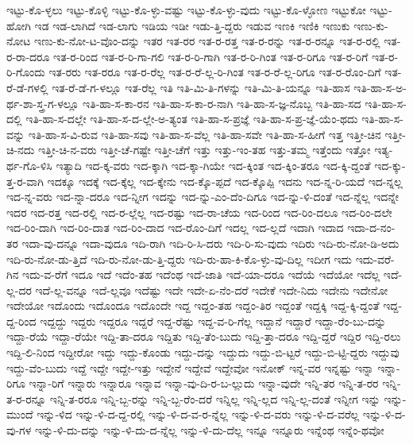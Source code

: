 {ಇಟ್ಟು-ಕೊ-ಳ್ಳಲು
ಇಟ್ಟು-ಕೊಳ್ಳಿ
ಇಟ್ಟು-ಕೊ-ಳ್ಳು-ವಷ್ಟು
ಇಟ್ಟು-ಕೊ-ಳ್ಳು-ವುದು
ಇಟ್ಟು-ಕೊ-ಳ್ಳೋಣ
ಇಟ್ಟುಕೋ
ಇಟ್ಟು-ಹೋಗಿ
ಇಡ
ಇಡ-ಲಾಗಿದೆ
ಇಡ-ಲಾಗು
ಇಡಿಯ
ಇಡೀ
ಇಡು-ತ್ತಿ-ದ್ದರು
ಇಡುವ
ಇಣಕಿ
ಇಣಿಕಿ
ಇಣುಕು
ಇಣು-ಕು-ನೋಟ
ಇಣು-ಕು-ನೋ-ಟ-ವೊಂ-ದನ್ನು
ಇತರ
ಇತ-ರರ
ಇತ-ರ-ರತ್ತ
ಇತ-ರ-ರನ್ನು
ಇತ-ರ-ರನ್ನೂ
ಇತ-ರ-ರಲ್ಲಿ
ಇತ-ರ-ರಾ-ದರೂ
ಇತ-ರ-ರಿಂದ
ಇತ-ರ-ರಿ-ಗಾ-ಗಲಿ
ಇತ-ರ-ರಿ-ಗಾಗಿ
ಇತ-ರ-ರಿ-ಗಿಂತ
ಇತ-ರ-ರಿಗೂ
ಇತ-ರ-ರಿಗೆ
ಇತ-ರ-ರಿ-ಗೊಂದು
ಇತ-ರರು
ಇತ-ರರೂ
ಇತ-ರ-ರೆಲ್ಲ
ಇತ-ರ-ರೆ-ಲ್ಲ-ರಿ-ಗಿಂತ
ಇತ-ರ-ರೆ-ಲ್ಲ-ರಿಗೂ
ಇತ-ರ-ರೊಂ-ದಿಗೆ
ಇತ-ರೆ-ಡೆ-ಗಳಲ್ಲಿ
ಇತ-ರೆ-ಡೆ-ಗ-ಳಲ್ಲೂ
ಇತ-ರೆಲ್ಲ
ಇತಿ
ಇತಿ-ಮಿ-ತಿ-ಗಳನ್ನು
ಇತಿ-ಮಿ-ತಿ-ಯನ್ನೂ
ಇತಿ-ಹಾಸ
ಇತಿ-ಹಾ-ಸ-ಅ-ರ್ಥ-ಶಾ-ಸ್ತ್ರ-ಗ-ಳಲ್ಲೂ
ಇತಿ-ಹಾ-ಸ-ಕಾ-ರನ
ಇತಿ-ಹಾ-ಸ-ಕಾ-ರ-ನಾಗಿ
ಇತಿ-ಹಾ-ಸ-ಜ್ಞ-ನೊಬ್ಬ
ಇತಿ-ಹಾ-ಸದ
ಇತಿ-ಹಾ-ಸ-ದಲ್ಲಿ
ಇತಿ-ಹಾ-ಸ-ದಲ್ಲೇ
ಇತಿ-ಹಾ-ಸ-ದ-ಲ್ಲೇ-ಅ-ತ್ಯಂತ
ಇತಿ-ಹಾ-ಸ-ಪ್ರಜ್ಞೆ
ಇತಿ-ಹಾ-ಸ-ಪ್ರ-ಜ್ಞೆ-ಯೆಂ-ಥದು
ಇತಿ-ಹಾ-ಸ-ವನ್ನು
ಇತಿ-ಹಾ-ಸ-ವಿ-ರುವ
ಇತಿ-ಹಾ-ಸವು
ಇತಿ-ಹಾ-ಸ-ವೆಲ್ಲ
ಇತಿ-ಹಾ-ಸವೇ
ಇತಿ-ಹಾ-ಸ-ಹೀಗೆ
ಇತ್ತ
ಇತ್ತೀ-ಚಿನ
ಇತ್ತೀ-ಚಿ-ನದು
ಇತ್ತೀ-ಚಿ-ನ-ವರು
ಇತ್ತೀ-ಚೆ-ಗಷ್ಟೇ
ಇತ್ತೀ-ಚೆಗೆ
ಇತ್ತು
ಇತ್ತು-ಇಂ-ತಹ
ಇತ್ತು-ತಮ್ಮ
ಇತ್ತೆಂದು
ಇತ್ತೋ
ಇತ್ಯ-ರ್ಥ-ಗೊ-ಳಿಸಿ
ಇತ್ಯಾದಿ
ಇದ-ಕ್ಕ-ವರು
ಇದ-ಕ್ಕಾಗಿ
ಇದ-ಕ್ಕಾ-ಗಿಯೇ
ಇದ-ಕ್ಕಿಂತ
ಇದ-ಕ್ಕಿಂ-ತರೂ
ಇದ-ಕ್ಕಿ-ದ್ದಂತೆ
ಇದ-ಕ್ಕು-ತ್ತ-ರ-ವಾಗಿ
ಇದಕ್ಕೂ
ಇದಕ್ಕೆ
ಇದ-ಕ್ಕೆಲ್ಲ
ಇದ-ಕ್ಕೇನು
ಇದ-ಕ್ಕೊ-ಪ್ಪದೆ
ಇದ-ಕ್ಕೊಪ್ಪಿ
ಇದನು
ಇದ-ನ್ನ-ರಿ-ಯದೆ
ಇದ-ನ್ನಲ್ಲ
ಇದ-ನ್ನ-ವರು
ಇದ-ನ್ನಾ-ದರೂ
ಇದ-ನ್ನೀಗ
ಇದನ್ನು
ಇದ-ನ್ನು-ಎಂ-ದೆಂ-ದಿಗೂ
ಇದ-ನ್ನು-ಳಿ-ದಂತೆ
ಇದ-ನ್ನೆಲ್ಲ
ಇದನ್ನೇ
ಇದರ
ಇದ-ರತ್ತ
ಇದ-ರಲ್ಲಿ
ಇದ-ರ-ಲ್ಲೆಲ್ಲ
ಇದ-ರಷ್ಟು
ಇದ-ರಾ-ಚೆಯ
ಇದ-ರಿಂದ
ಇದ-ರಿಂ-ದಲೂ
ಇದ-ರಿಂ-ದಲೇ
ಇದ-ರಿಂ-ದಾಗಿ
ಇದ-ರಿಂ-ದಾತ
ಇದ-ರಿಂ-ದಾದ
ಇದ-ರೊಂ-ದಿಗೆ
ಇದಲ್ಲ
ಇದ-ಲ್ಲದೆ
ಇದಾಗಿ
ಇದಾದ
ಇದಾ-ದ-ನಂ-ತರ
ಇದಾ-ವು-ದನ್ನೂ
ಇದಾ-ವುದೂ
ಇದಿ-ರಾಗಿ
ಇದಿ-ರಿ-ಸಿ-ದರು
ಇದಿ-ರಿ-ಸು-ವುದು
ಇದಿರು
ಇದಿ-ರು-ನೋ-ಡಿ-ಅದು
ಇದಿ-ರು-ನೋ-ಡು-ತ್ತಿದೆ
ಇದಿ-ರು-ನೋ-ಡು-ತ್ತಿ-ದ್ದರು
ಇದಿ-ರು-ಹಾ-ಕಿ-ಕೊ-ಳ್ಳು-ವು-ದಿಲ್ಲ
ಇದೀಗ
ಇದು
ಇದು-ವರೆ-ಗಿನ
ಇದು-ವ-ರೆಗೆ
ಇದೂ
ಇದೆ
ಇದೆಂ-ತಹ
ಇದೆಂಥ
ಇದೆ-ಜಾತಿ
ಇದೆ-ಯಾ-ದರೂ
ಇದೆಯೆ
ಇದೆಯೋ
ಇದೆಲ್ಲ
ಇದೆ-ಲ್ಲ-ದರ
ಇದೆ-ಲ್ಲ-ವನ್ನೂ
ಇದೆ-ಲ್ಲವೂ
ಇದೆಷ್ಟು
ಇದೇ
ಇದೇ-ಏ-ನೆಂ-ದರೆ
ಇದೇಕೆ
ಇದೇ-ನಿದು
ಇದೇನು
ಇದೇನೋ
ಇದೇಯೋ
ಇದೊಂದು
ಇದೊಂದೂ
ಇದೊಂದೇ
ಇದ್ದ
ಇದ್ದಂ-ತಹ
ಇದ್ದಂ-ತಿರ
ಇದ್ದಂತೆ
ಇದ್ದಕ್ಕಿ
ಇದ್ದ-ಕ್ಕಿ-ದ್ದಂತೆ
ಇದ್ದ-ದ್ದ-ರಿಂದ
ಇದ್ದದ್ದು
ಇದ್ದರು
ಇದ್ದರೂ
ಇದ್ದರೆ
ಇದ್ದ-ರೆಷ್ಟು
ಇದ್ದ-ವ-ರಿ-ಗೆಲ್ಲ
ಇದ್ದಾನೆ
ಇದ್ದಾರೆ
ಇದ್ದಾ-ರೆಂ-ಬು-ದನ್ನು
ಇದ್ದಾ-ರೆಯೆ
ಇದ್ದಾ-ರೆಯೇ
ಇದ್ದಿ-ತಾ-ದರೂ
ಇದ್ದಿತು
ಇದ್ದಿ-ತೆಂ-ಬುದು
ಇದ್ದಿ-ತ್ತಾ-ದರೂ
ಇದ್ದಿ-ದ್ದರೆ
ಇದ್ದಿರ
ಇದ್ದಿ-ರಲು
ಇದ್ದಿ-ಲಿ-ನಿಂದ
ಇದ್ದೀರೋ
ಇದ್ದು
ಇದ್ದು-ಕೊಂಡು
ಇದ್ದು-ದನ್ನು
ಇದ್ದುದು
ಇದ್ದು-ಬಿ-ಟ್ಟರೆ
ಇದ್ದು-ಬಿ-ಟ್ಟಿ-ದ್ದರು
ಇದ್ದುವು
ಇದ್ದು-ವೆಂ-ಬುದು
ಇದ್ದೆ
ಇದ್ದೇ
ಇದ್ದೇ-ಇತ್ತು
ಇದ್ದೇನೆ
ಇದ್ದೇವೆ
ಇದ್ದೇವೋ
ಇನೋಕ್
ಇನ್ನ-ವರ
ಇನ್ನಷ್ಟು
ಇನ್ನಾ
ಇನ್ನಾ-ರಿಗೂ
ಇನ್ನಾ-ರಿಗೆ
ಇನ್ನಾರು
ಇನ್ನಾರೂ
ಇನ್ನಾವ
ಇನ್ನಾ-ವು-ದಿ-ರ-ಬ-ಲ್ಲುದು
ಇನ್ನಾ-ವುದೇ
ಇನ್ನಿ-ತರ
ಇನ್ನಿ-ತ-ರರ
ಇನ್ನಿ-ತ-ರ-ರನ್ನೂ
ಇನ್ನಿ-ತ-ರರೂ
ಇನ್ನಿ-ಬ್ಬ-ರನ್ನು
ಇನ್ನಿ-ಬ್ಬ-ರೆಂ-ದರೆ
ಇನ್ನಿಲ್ಲ
ಇನ್ನಿ-ಲ್ಲದ
ಇನ್ನಿ-ಲ್ಲ-ದಂತೆ
ಇನ್ನೀಗ
ಇನ್ನು
ಇನ್ನು-ಮುಂದೆ
ಇನ್ನು-ಳಿದ
ಇನ್ನು-ಳಿ-ದ-ದ್ದ-ರಲ್ಲಿ
ಇನ್ನು-ಳಿ-ದ-ವ-ರ-ನ್ನೆಲ್ಲ
ಇನ್ನು-ಳಿ-ದ-ವರು
ಇನ್ನು-ಳಿ-ದ-ವರೆಲ್ಲ
ಇನ್ನು-ಳಿ-ದ-ವು-ಗಳ
ಇನ್ನು-ಳಿ-ದು-ದನ್ನು
ಇನ್ನು-ಳಿ-ದು-ದ-ನ್ನೆಲ್ಲ
ಇನ್ನು-ಳಿ-ದು-ದೆಲ್ಲ
ಇನ್ನೂ
ಇನ್ನೂರು
ಇನ್ನೆಂಥ
ಇನ್ನೆಂ-ಥವೋ
}
